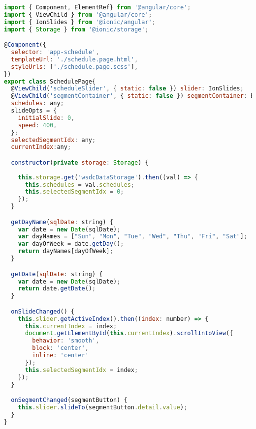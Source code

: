 \begin{lstlisting}[language=JavaScript, label={lst:schedule.page.ts}, caption=schedule.page.ts]
import { Component, ElementRef} from '@angular/core';
import { ViewChild } from '@angular/core';
import { IonSlides } from '@ionic/angular';
import { Storage } from '@ionic/storage';

@Component({
  selector: 'app-schedule',
  templateUrl: './schedule.page.html',
  styleUrls: ['./schedule.page.scss'],
})
export class SchedulePage{
  @ViewChild('scheduleSlider', { static: false }) slider: IonSlides;
  @ViewChild('segmentContainer', { static: false }) segmentContainer: ElementRef;
  schedules: any;
  slideOpts = {
    initialSlide: 0,
    speed: 400,
  };
  selectedSegmentIdx: any;
  currentIndex:any;

  constructor(private storage: Storage) {
    
    this.storage.get('wsdcDataStorage').then((val) => {
      this.schedules = val.schedules;
      this.selectedSegmentIdx = 0;
    });
  }

  getDayName(sqlDate: string) {
    var date = new Date(sqlDate);
    var dayNames = ["Sun", "Mon", "Tue", "Wed", "Thu", "Fri", "Sat"];
    var dayOfWeek = date.getDay();
    return dayNames[dayOfWeek];
  }

  getDate(sqlDate: string) {
    var date = new Date(sqlDate);
    return date.getDate();
  }

  onSlideChanged() {
    this.slider.getActiveIndex().then((index: number) => {
      this.currentIndex = index;
      document.getElementById(this.currentIndex).scrollIntoView({
        behavior: 'smooth',
        block: 'center',
        inline: 'center'
      });
      this.selectedSegmentIdx = index;
    });
  }

  onSegmentChanged(segmentButton) {
    this.slider.slideTo(segmentButton.detail.value);
  }
}

\end{lstlisting} 

